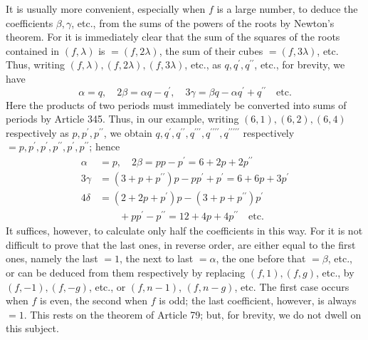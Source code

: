 \clearpage
{}
It is usually more convenient, especially when \(f\) is a large number, to deduce the coefficients \(\beta,\allowbreak \gamma\), etc., from the sums of the powers of the roots by Newton's theorem. For it is immediately clear that the sum of the squares of the roots contained in \((f,\lambda)\) is \(=(f,2\lambda)\), the sum of their cubes \(=(f,3\lambda)\), etc. Thus, writing \((f,\lambda),\allowbreak (f,2\lambda),\allowbreak (f,3\lambda)\), etc., as \(q,\allowbreak q^{\prime},\allowbreak q^{\prime\prime}\), etc., for brevity, we have \[\alpha=q,\quad 2\beta=\alpha q-q^{\prime},\quad 3\gamma=\beta q-\alpha q^{\prime}+q^{\prime\prime}\quad\text{etc.}\] Here the products of two periods must immediately be converted into sums of periods by Article 345. Thus, in our example, writing \((6,1),\allowbreak (6,2),\allowbreak (6,4)\) respectively as \(p,\allowbreak p^{\prime},\allowbreak p^{\prime\prime}\), we obtain \(q,\allowbreak q^{\prime},\allowbreak q^{\prime\prime},\allowbreak q^{\prime\prime\prime},\allowbreak q^{\prime\prime\prime\prime},\allowbreak q^{\prime\prime\prime\prime\prime}\) respectively \(=p,\allowbreak p^{\prime},\allowbreak p^{\prime},\allowbreak p^{\prime\prime},\allowbreak p^{\prime},\allowbreak p^{\prime\prime}\); hence \[\begin{aligned}
\alpha&=p,\quad2\beta=pp-p^{\prime}=6+2p+2p^{\prime\prime}\\
3\gamma&=(3+p+p^{\prime\prime})p-pp^{\prime}+p^{\prime}=6+6p+3p^{\prime}\\
4\delta&=(2+2p+p^{\prime})p-(3+p+p^{\prime\prime})p^{\prime}\\
&\qquad+pp^{\prime}-p^{\prime\prime}=12+4p+4p^{\prime\prime}\quad\mathrm{etc.}
\end{aligned}\] It suffices, however, to calculate only half the coefficients in this way. For it is not difficult to prove that the last ones, in reverse order, are either equal to the first ones, namely the last \(=1\), the next to last \(=\alpha\), the one before that \(=\beta\), etc., or can be deduced from them respectively by replacing \((f,1),\allowbreak (f,g)\), etc., by \((f,-1),\allowbreak (f,-g)\), etc., or \((f,n-1)\), \((f,n-g)\), etc. The first case occurs when \(f\) is even, the second when \(f\) is odd; the last coefficient, however, is always \(=1\). This rests on the theorem of Article 79; but, for brevity, we do not dwell on this subject.

